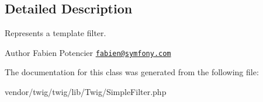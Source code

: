 \subsection{Detailed Description}
Represents a template filter.

\begin{DoxyAuthor}{Author}
Fabien Potencier \href{mailto:fabien@symfony.com}{\tt fabien@symfony.\+com} 
\end{DoxyAuthor}


The documentation for this class was generated from the following file\+:\begin{DoxyCompactItemize}
\item 
vendor/twig/twig/lib/\+Twig/Simple\+Filter.\+php\end{DoxyCompactItemize}
